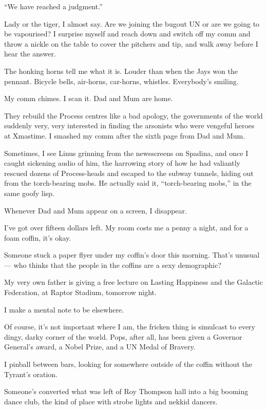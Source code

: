 ``We have reached a judgment.''

Lady or the tiger, I almost say. Are we joining the bugout UN or
are we going to be vapourised? I surprise myself and reach down and
switch off my comm and throw a nickle on the table to cover the
pitchers and tip, and walk away before I hear the answer.

The honking horns tell me what it is. Louder than  when the Jays
won the pennant. Bicycle bells, air-horns, car-horns, whistles.
Everybody's smiling.

My comm chimes. I scan it. Dad and Mum are home.

\tb

They rebuild the Process centres like a bad apology, the
governments of the world suddenly very, very interested in finding
the arsonists who were vengeful heroes at Xmastime. I smashed my
comm after the sixth page from Dad and Mum.

Sometimes, I see Linus grinning from the newsscreens on Spadina,
and once I caught sickening audio of him, the harrowing story of
how he had valiantly rescued dozens of Process-heads and escaped to
the subway tunnels, hiding out from the torch-bearing mobs. He
actually said it, ``torch-bearing mobs,'' in the same goofy lisp.

Whenever Dad and Mum appear on a screen, I disappear.

I've got over fifteen dollars left. My room costs me a penny a
night, and for a foam coffin, it's okay.

\tb

Someone stuck a paper flyer under my coffin's door this morning.
That's unusual --- who thinks that the people in the coffins are a
sexy demographic?

My very own father is giving a free lecture on Lasting Happiness
and the Galactic Federation, at Raptor Stadium, tomorrow night.

I make a mental note to be elsewhere.

Of course, it's not important where I am, the fricken thing is
simulcast to every dingy, darky corner of the world. Pops, after
all, has been given a Governor General's award, a Nobel Prize, and
a UN Medal of Bravery.

I pinball between bars, looking for somewhere outside of the coffin
without the Tyrant's oration.

Someone's converted what was left of Roy Thompson hall into a big
booming dance club, the kind of place with strobe lights and nekkid
dancers.

